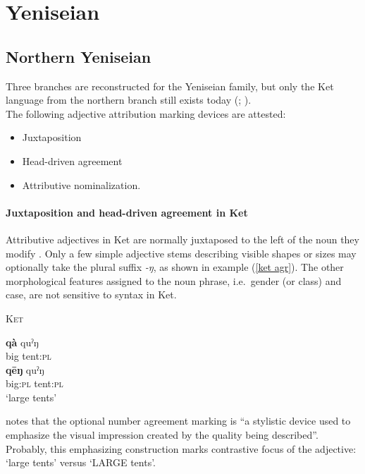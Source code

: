 \section{Yeniseian}\label{yeniseian synchr}
\subsection{Northern Yeniseian}
Three branches are reconstructed for the Yeniseian family, but only the Ket language from the northern branch still exists today (\citealt{werner1997a}; \citealt[223]{salminen2007}).\\

\noindent The following adjective attribution marking devices are attested:
\begin{itemize}
\item Juxtaposition
\item Head-driven agreement
\item Attributive nominalization.
\end{itemize}

\paragraph{Juxtaposition and head-driven agreement in Ket}
Attributive adjectives in Ket are normally juxtaposed to the left of the noun they modify \cite[38]{vajda2004}. Only a few simple adjective stems describing visible shapes or sizes may optionally take the plural suffix \textit{-ŋ}, as shown in example (\ref{ket agr}). The other morphological features assigned to the noun phrase, i.e.~gender (or class) and case, are not sensitive to syntax in Ket.
\begin{exe}
\ex \textsc{Ket} \cite[38]{vajda2004} \label{ket agr}
\begin{xlist}
\ex	
\gll	\textbf{qà} quˀŋ\\
	big tent:\textsc{pl}\\
\ex	
\gll	\textbf{qēŋ} quˀŋ\\
	big:\textsc{pl} tent:\textsc{pl}\\
\glt	‘large tents’
\end{xlist}
\end{exe}
\citet[38]{vajda2004} notes that the optional number agreement marking is “a stylistic device used to emphasize the visual impression created by the quality being described”. Probably, this emphasizing construction marks contrastive focus of the adjective: ‘large tents’ versus ‘LARGE tents’. 

